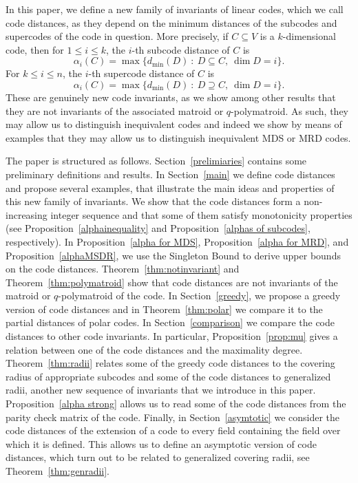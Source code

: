 \documentclass[12pt]{amsart}
\numberwithin{equation}{section}
\theoremstyle{definition}
\begin{document}
In this paper, we define a new family of invariants of linear codes, which we call code distances, as they depend on the minimum distances of the subcodes and supercodes of the code in question. More precisely, if $C\subseteq V$ is a $k$-dimensional code, then for $1\leq i\leq k$, the $i$-th subcode distance of $C$ is
$$\alpha_i(C)=\max\{d_{\min}(D)\ :\ D\subseteq C,\ \dim D=i\}.$$
For $k\leq i\leq n$, the $i$-th supercode distance of $C$ is
$$\alpha_i(C)=\max\{d_{\min}(D)\ :\ D\supseteq C,\ \dim D=i\}.$$
These are genuinely new code invariants, as we show among other results that they are not invariants of the associated matroid or $q$-polymatroid. As such, they may allow us to distinguish inequivalent codes and indeed we show by means of examples that they may allow us to distinguish inequivalent MDS or MRD codes. 

The paper is structured as follows. Section~\ref{prelimiaries} contains some preliminary definitions and results. In Section~\ref{main} we define code distances and propose several examples, that illustrate the main ideas and properties of this new family of invariants. We show that the code distances form a non-increasing integer sequence and that some of them satisfy monotonicity properties (see Proposition~\ref{alphainequality} and Proposition~\ref{alphas of subcodes}, respectively). In Proposition~\ref{alpha for MDS}, Proposition~\ref{alpha for MRD}, and Proposition~\ref{alphaMSDR}, we use the Singleton Bound to derive upper bounds on the code distances. Theorem~\ref{thm:notinvariant} and Theorem~\ref{thm:polymatroid} show that code distances are not invariants of the matroid or $q$-polymatroid of the code. In Section~\ref{greedy}, we propose a greedy version of code distances and in Theorem~\ref{thm:polar} we compare it to the partial distances of polar codes. In Section~\ref{comparison} we compare the code distances to other code invariants. In particular, Proposition~\ref{prop:mu} gives a relation between one of the code distances and the maximality degree. Theorem~\ref{thm:radii} relates some of the greedy code distances to the covering radius of appropriate subcodes and some of the code distances to generalized radii, another new sequence of invariants that we introduce in this paper. Proposition~\ref{alpha strong} allows us to read some of the code distances from the parity check matrix of the code. Finally, in Section~\ref{asymtotic} we consider the code distances of the extension of a code to every field containing the field over which it is defined. This allows us to define an asymptotic version of code distances, which turn out to be related to generalized covering radii, see Theorem~\ref{thm:genradii}.
\end{document}
